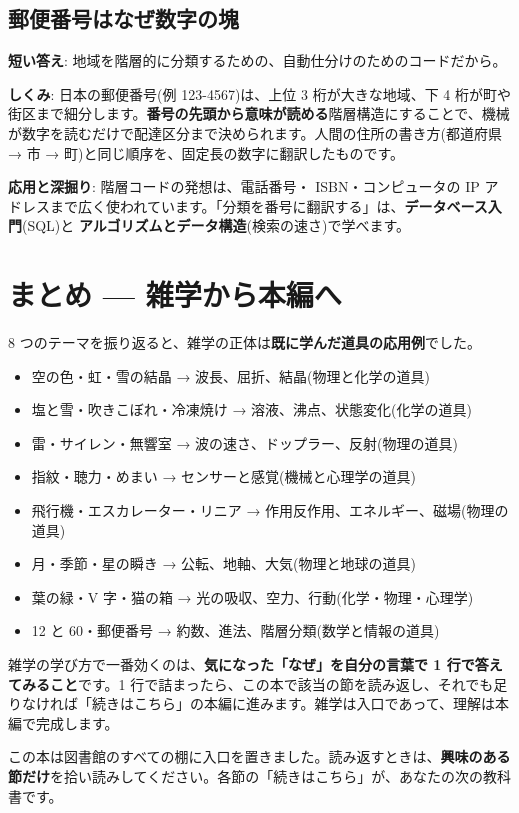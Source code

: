 \documentclass{article}
\begin{document}
\subsection{郵便番号はなぜ数字の塊}

\textbf{短い答え}: 地域を階層的に分類するための、自動仕分けのためのコードだから。

\textbf{しくみ}: 日本の郵便番号(例 123-4567)は、上位 3 桁が大きな地域、下 4 桁が町や街区まで細分します。\textbf{番号の先頭から意味が読める}階層構造にすることで、機械が数字を読むだけで配達区分まで決められます。人間の住所の書き方(都道府県 → 市 → 町)と同じ順序を、固定長の数字に翻訳したものです。

\textbf{応用と深掘り}: 階層コードの発想は、電話番号・ ISBN・コンピュータの IP アドレスまで広く使われています。「分類を番号に翻訳する」は、\textbf{データベース入門}(SQL)と \textbf{アルゴリズムとデータ構造}(検索の速さ)で学べます。

\section{まとめ — 雑学から本編へ}

8 つのテーマを振り返ると、雑学の正体は\textbf{既に学んだ道具の応用例}でした。

\begin{itemize}
\item 空の色・虹・雪の結晶 → 波長、屈折、結晶(物理と化学の道具)
\item 塩と雪・吹きこぼれ・冷凍焼け → 溶液、沸点、状態変化(化学の道具)
\item 雷・サイレン・無響室 → 波の速さ、ドップラー、反射(物理の道具)
\item 指紋・聴力・めまい → センサーと感覚(機械と心理学の道具)
\item 飛行機・エスカレーター・リニア → 作用反作用、エネルギー、磁場(物理の道具)
\item 月・季節・星の瞬き → 公転、地軸、大気(物理と地球の道具)
\item 葉の緑・V 字・猫の箱 → 光の吸収、空力、行動(化学・物理・心理学)
\item 12 と 60・郵便番号 → 約数、進法、階層分類(数学と情報の道具)
\end{itemize}

雑学の学び方で一番効くのは、\textbf{気になった「なぜ」を自分の言葉で 1 行で答えてみること}です。1 行で詰まったら、この本で該当の節を読み返し、それでも足りなければ「続きはこちら」の本編に進みます。雑学は入口であって、理解は本編で完成します。

この本は図書館のすべての棚に入口を置きました。読み返すときは、\textbf{興味のある節だけ}を拾い読みしてください。各節の「続きはこちら」が、あなたの次の教科書です。
\end{document}
